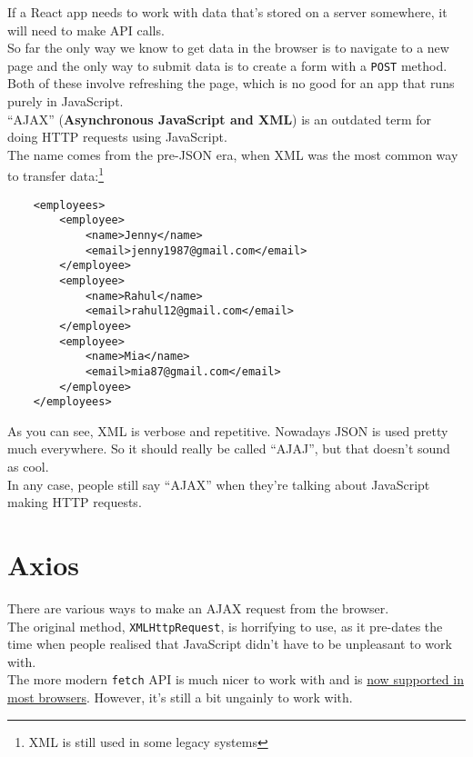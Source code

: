 If a React app needs to work with data that's stored on a server somewhere, it will need to make API calls.
\\

So far the only way we know to get data in the browser is to navigate to a new page and the only way to submit data is to create a form with a \texttt{POST} method. Both of these involve refreshing the page, which is no good for an app that runs purely in JavaScript.
\\


``AJAX'' (\textbf{Asynchronous JavaScript and XML}) is an outdated term for doing HTTP requests using JavaScript.
\\

The name comes from the pre-JSON era, when XML was the most common way to transfer data:\footnote{XML is still used in some legacy systems}

\begin{verbatim}
    <employees>
        <employee>
            <name>Jenny</name>
            <email>jenny1987@gmail.com</email>
        </employee>
        <employee>
            <name>Rahul</name>
            <email>rahul12@gmail.com</email>
        </employee>
        <employee>
            <name>Mia</name>
            <email>mia87@gmail.com</email>
        </employee>
    </employees>
\end{verbatim}

As you can see, XML is verbose and repetitive. Nowadays JSON is used pretty much everywhere. So it should really be called ``AJAJ'', but that doesn't sound as cool.
\\

In any case, people still say ``AJAX'' when they're talking about JavaScript making HTTP requests.


\section{Axios}

There are various ways to make an AJAX request from the browser.
\\

The original method, \texttt{XMLHttpRequest}, is horrifying to use, as it pre-dates the time when people realised that JavaScript didn't have to be unpleasant to work with.
\\

The more modern \texttt{fetch} API is much nicer to work with and is \href{https://caniuse.com/#feat=fetch}{now supported in most browsers}. However, it's still a bit ungainly to work with.
\\


